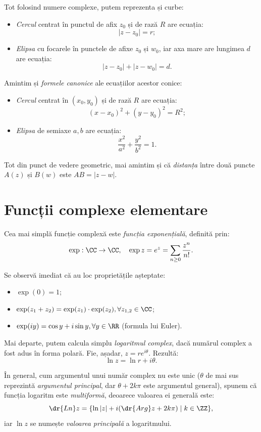 Tot folosind numere complexe, putem reprezenta și curbe:
\begin{itemize}
\item \emph{Cercul} centrat în punctul de afix $ z_0 $ și de rază $ R $ are ecuația:
  \[
    |z - z_0| = r;
  \]
\item \emph{Elipsa} cu focarele în punctele de afixe $ z_0 $ și $ w_0 $,
  iar axa mare are lungimea $ d $ are ecuația:
  \[
    |z - z_0| + |z - w_0| = d.
  \]
\end{itemize}

Amintim și \emph{formele canonice} ale ecuațiilor acestor conice:
\begin{itemize}
\item \emph{Cercul} centrat în $ (x_0, y_0) $ și de rază $ R $ are
  ecuația:
  \[
    (x - x_0)^2 + (y - y_0)^2 = R^2;
  \]
\item \emph{Elipsa} de semiaxe $ a, b $ are ecuația:
  \[
    \dfrac{x^2}{a^2} + \dfrac{y^2}{b^2} = 1.
  \]
\end{itemize}

Tot din punct de vedere geometric, mai amintim și că \emph{distanța} între
două puncte $ A(z) $ și $ B(w) $ este $ AB = |z - w| $.

\section{Funcții complexe elementare}

Cea mai simplă funcție complexă este \emph{funcția exponențială}, definită prin:
\[
  \exp : \CC \to \CC, \quad \exp z = e^z = \sum_{n \geq 0} \dfrac{z^n}{n!}.
\]

Se observă imediat că au loc proprietățile așteptate:
\begin{itemize}
\item $ \exp(0) = 1 $;
\item $ \exp(z_1 + z_2) = \exp(z_1) \cdot \exp(z_2), \forall z_{1,2} \in \CC $;
\item $ \exp(iy) = \cos y + i \sin y, \forall y \in \RR $ (formula lui Euler).
\end{itemize}

Mai departe, putem calcula simplu \emph{logaritmul complex}, dacă numărul complex
a fost adus în forma polară. Fie, așadar, $ z = re^{i\theta} $. Rezultă:
\[
  \ln z = \ln r + i\theta.
\]

În general, cum argumentul unui număr complex nu este unic ($ \theta $ de mai sus
reprezintă \emph{argumentul principal}, dar $ \theta + 2 k\pi $ este argumentul
general), spunem că funcția logaritm este \emph{multiformă}, deoarece valoarea ei
generală este:
\[
  \dr{Ln}z = \{ \ln |z| + i(\dr{Arg}z + 2 k \pi) \mid k \in \ZZ \},
\]
iar $ \ln z $ se numește \emph{valoarea principală} a logaritmului.

